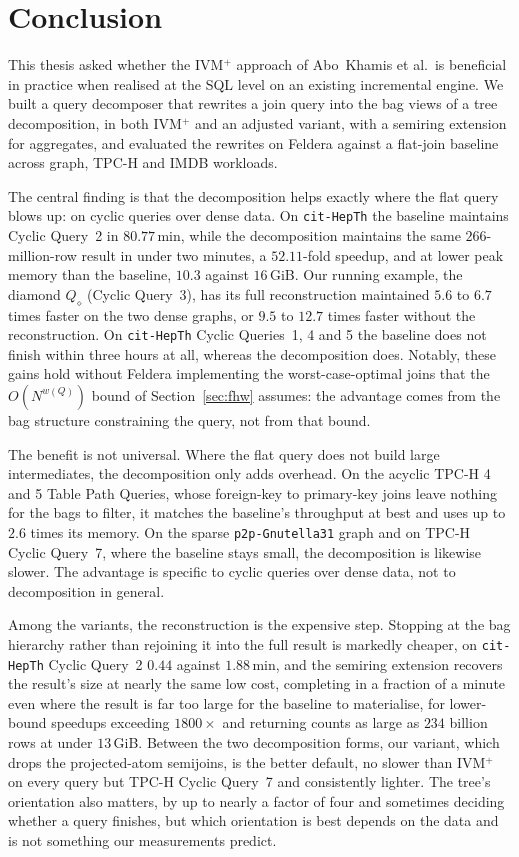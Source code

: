 \chapter{Conclusion}
\label{ch:conclusion}

This thesis asked whether the IVM$^+$ approach of Abo~Khamis et al.\ is beneficial in practice when realised at the SQL level on an existing incremental engine. We built a query decomposer that rewrites a join query into the bag views of a tree decomposition, in both IVM$^+$ and an adjusted variant, with a semiring extension for aggregates, and evaluated the rewrites on Feldera against a flat-join baseline across graph, TPC-H and IMDB workloads.

The central finding is that the decomposition helps exactly where the flat query blows up: on cyclic queries over dense data. On \texttt{cit-HepTh} the baseline maintains Cyclic Query~2 in $80.77$\,min, while the decomposition maintains the same $266$-million-row result in under two minutes, a $52.11$-fold speedup, and at lower peak memory than the baseline, $10.3$ against $16$\,GiB. Our running example, the diamond $Q_\diamond$ (Cyclic Query~3), has its full reconstruction maintained $5.6$ to $6.7$ times faster on the two dense graphs, or $9.5$ to $12.7$ times faster without the reconstruction. On \texttt{cit-HepTh} Cyclic Queries~1, 4 and 5 the baseline does not finish within three hours at all, whereas the decomposition does. Notably, these gains hold without Feldera implementing the worst-case-optimal joins that the $O(N^{w(Q)})$ bound of Section~\ref{sec:fhw} assumes: the advantage comes from the bag structure constraining the query, not from that bound.

The benefit is not universal. Where the flat query does not build large intermediates, the decomposition only adds overhead. On the acyclic TPC-H 4 and 5 Table Path Queries, whose foreign-key to primary-key joins leave nothing for the bags to filter, it matches the baseline's throughput at best and uses up to $2.6$ times its memory. On the sparse \texttt{p2p-Gnutella31} graph and on TPC-H Cyclic Query~7, where the baseline stays small, the decomposition is likewise slower. The advantage is specific to cyclic queries over dense data, not to decomposition in general.

Among the variants, the reconstruction is the expensive step. Stopping at the bag hierarchy rather than rejoining it into the full result is markedly cheaper, on \texttt{cit-HepTh} Cyclic Query~2 $0.44$ against $1.88$\,min, and the semiring extension recovers the result's size at nearly the same low cost, completing in a fraction of a minute even where the result is far too large for the baseline to materialise, for lower-bound speedups exceeding $1800\times$ and returning counts as large as $234$ billion rows at under $13$\,GiB. Between the two decomposition forms, our variant, which drops the projected-atom semijoins, is the better default, no slower than IVM$^+$ on every query but TPC-H Cyclic Query~7 and consistently lighter. The tree's orientation also matters, by up to nearly a factor of four and sometimes deciding whether a query finishes, but which orientation is best depends on the data and is not something our measurements predict.

